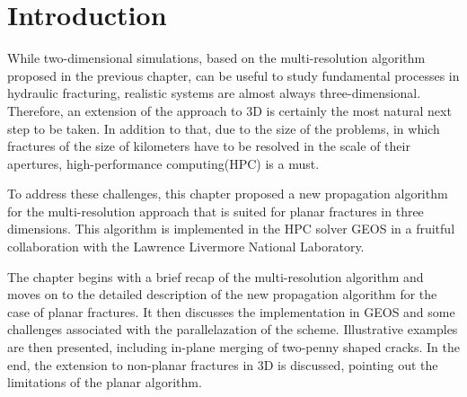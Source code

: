 \section{Introduction}
\label{section: Chapter4/intro}

While two-dimensional simulations, based on the multi-resolution algorithm proposed in the previous chapter, can be useful to study fundamental processes in hydraulic fracturing, realistic systems are almost always three-dimensional. Therefore, an extension of the approach to 3D is certainly the most natural next step to be taken. In addition to that, due to the size of the problems, in which fractures of the size of kilometers have to be resolved in the scale of their apertures, high-performance computing(HPC) is a must. 

To address these challenges, this chapter proposed a new propagation algorithm for the multi-resolution approach that is suited for planar fractures in three dimensions. This algorithm is implemented in the HPC solver GEOS \cite{settgast2012simulation,settgast2014simulation,settgast2017fully} in a fruitful collaboration with the Lawrence Livermore National Laboratory. 

The chapter begins with a brief recap of the multi-resolution algorithm and moves on to the detailed description of the new propagation algorithm for the case of planar fractures. It then discusses the implementation in GEOS and some challenges associated with the parallelazation of the scheme. Illustrative examples are then presented, including in-plane merging of two-penny shaped cracks.
In the end, the extension to non-planar fractures in 3D is discussed, pointing out the limitations of the planar algorithm.  




